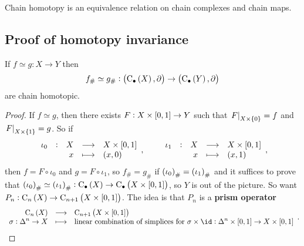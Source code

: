 \begin{exercise*}
Chain homotopy is an equivalence relation on chain complexes and chain maps.
\end{exercise*}

\subsection{Proof of homotopy invariance}

\begin{theorem}
If $ f \simeq g : X \to Y $ then
$$ f_\# \simeq g_\# : \br{\C_\bullet\br{X}, \da} \to \br{\C_\bullet\br{Y}, \da} $$
are chain homotopic.
\end{theorem}

\begin{proof}
If $ f \simeq g $, then there exists $ F : X \times \sbr{0, 1} \to Y $ such that $ \eval{F}_{X \times \cbr{0}} = f $ and $ \eval{F}_{X \times \cbr{1}} = g $. So if
$$ \function[\iota_0]{X}{X \times \sbr{0, 1}}{x}{\br{x, 0}}, \qquad \function[\iota_1]{X}{X \times \sbr{0, 1}}{x}{\br{x, 1}}, $$
then $ f = F \circ \iota_0 $ and $ g = F \circ \iota_1 $, so $ f_\# = g_\# $ if $ \br{\iota_0}_\# = \br{\iota_1}_\# $ and it suffices to prove that $ \br{\iota_0}_\# \simeq \br{\iota_1}_\# : \C_\bullet\br{X} \to \C_\bullet\br{X \times \sbr{0, 1}} $, so $ Y $ is out of the picture. So want $ P_n : \C_n\br{X} \to \C_{n + 1}\br{X \times \sbr{0, 1}} $. The idea is that $ P_n $ is a \textbf{prism operator}
$$ \function{\C_n\br{X}}{\C_{n + 1}\br{X \times \sbr{0, 1}}}{\sigma : \Delta^n \to X}{\text{linear combination of simplices for} \ \sigma \times \id : \Delta^n \times \sbr{0, 1} \to X \times \sbr{0, 1}}. $$

\pagebreak


\end{proof}
